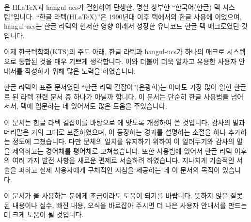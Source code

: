 \begin{preamtext}

\kotex 은 H\LaTeX 과 hangul-ucs가 결합하여 탄생한, 명실
상부한 ``한국어(한글) 텍 시스템''입니다. ``한글 라텍(H\LaTeX)''은 1990년대 이후
텍에서의 한글 사용에 이었으며, hangul-ucs는
한글 라텍의 현저한 영향 아래서 성장한 유니코드 한글 텍 매크로였던 것입니다.

이제 한국텍학회(KTS)의 주도 아래, 한글 라텍과 hangul-ucs가
하나의 매크로 시스템으로 통합된 것을 매우 기쁘게 생각합니다.
이와 더불어 더욱 알차고 유용한 사용자 안내서를 작성하기 위해
많은 노력을 하였습니다.

한글 라텍의 표준 문서였던 ``한글 라텍 길잡이''(은광희)는 아마도 가장 많이
읽힌 한글로 된 라텍 관련 문서 중 하나가 아닐까 합니다. 이 문서는 단순히 한글
사용법을 넘어서서, 텍에 입문하는 데 있어서도 많은 도움을 주었습니다.

이 문서는 한글 라텍 길잡이를 바탕으로 \kotex 에 맞도록 개정하여
쓴 것입니다. 감사의 말과 머리말은 거의 그대로 보존하였으며, \kotex 이
등장하는 경과를 설명하는 소절을 하나 추가하는 정도에 그쳤습니다.
다만 문체의 일치를 유지하기 위하여 이 일러두기와 감사의 말을 제외하고는
경어체를 평어체로 고쳐썼습니다. 또한
사용법에 있어서 한글 라텍 이후의 여러 가지 발전 사항을 새로운 편제로
서술하려 하였습니다. 지나치게 기술적인 서술을 피하고 실제 사용자에게
구체적인 지침을 제공하는 데 이 문서의 목적이 있습니다. 

이 문서가 \kotex 을 사용하는 분에게 조금이라도 도움이 되기를 바랍니다.
뜻하지 않은 잘못된 내용이나 실수, 빠진 내용, 오식을 바로잡아 주시면 더 나은
사용자 안내서를 만드는 데 크게 도움이 될 것입니다. 

\bigskip
{}

\end{preamtext}

